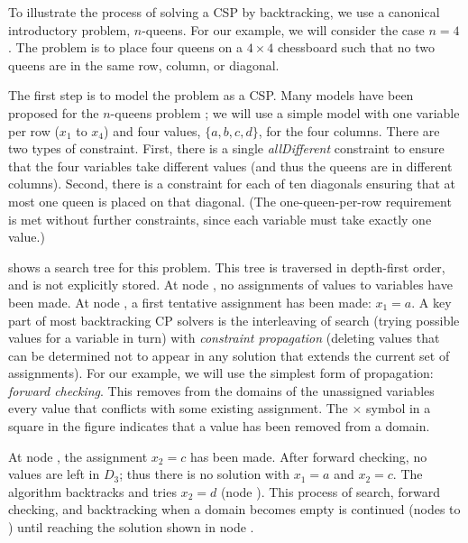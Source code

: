 To illustrate the process of solving a CSP by backtracking, we use a canonical
introductory problem, $n$-queens. For our example, we will consider the case
$n=4$. The problem is to place four queens on a $4 \times 4$ chessboard such
that no two queens are in the same row, column, or diagonal.

The first step is to model the problem as a CSP. Many models have been proposed
for the $n$-queens problem \citep{DBLP:reference/fai/Smith06}; we will use a
simple model with one variable per row ($x_1$ to $x_4$) and four values, $\{a, b, c, d\}$, for
the four columns.  There are two types of constraint. First, there is a single
\emph{allDifferent} constraint to ensure that the four variables take different
values (and thus the queens are in different columns). Second, there is a
constraint for each of ten diagonals
ensuring that at most one queen is placed on that diagonal.
(The one-queen-per-row requirement is met without further constraints,
since each variable must take exactly one value.)

 shows a search tree for this problem.
This tree is traversed in depth-first order, and is not explicitly
stored.
At node ,
no assignments of values to variables have been made. At node , a first
tentative assignment has been made: $x_1=a$. A key part of most backtracking CP
solvers is the interleaving of search (trying possible values for a variable
in turn) with \emph{constraint propagation} (deleting values that can be
determined not to appear in any solution that extends the current set of
assignments). For our example, we will use the simplest form of propagation:
\emph{forward checking}. This removes from the domains of the unassigned variables
every value that conflicts with some existing assignment. The $\times$ symbol
in a square in the figure indicates that a value has been removed from a domain.

At node , the assignment $x_2=c$ has been made. After forward checking, no
values are left in $D_3$; thus there is no solution with $x_1=a$ and $x_2=c$.
The algorithm backtracks and tries $x_2=d$
(node ). This process of search, forward checking, and backtracking when
a domain becomes empty is continued (nodes  to ) until reaching the solution
shown in node .

